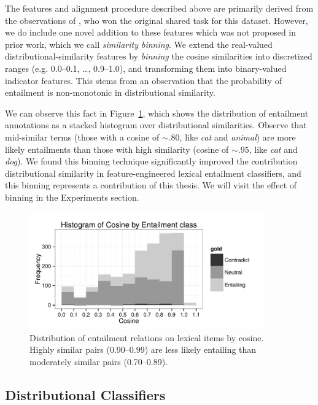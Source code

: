 The features and alignment procedure described above are primarily derived
from the observations of \cite{lai:2014:semeval}, who won the original shared
task for this dataset. However, we do include one novel addition to
these features which was not proposed in prior work, which we call
{\em similarity binning}. We extend the real-valued distributional-similarity
features by {\em binning} the cosine similarities into discretized ranges
(e.g. 0.0--0.1, \ldots, 0.9--1.0), and transforming them into binary-valued
indicator features. This stems from an observation that the probability of
entailment is non-monotonic in distributional similarity.

We can observe this fact in Figure~\ref{fig:valley}, which shows the
distribution of entailment annotations as a stacked histogram over
distributional similarities. Observe that
mid-similar terms (those with a cosine of $\sim.80$, like {\em cat} and {\em
animal}) are more likely entailments than those with high similarity
(cosine of $\sim.95$, like {\em cat} and {\em dog}). We found this binning
technique significantly improved the contribution distributional similarity
in feature-engineered lexical entailment classifiers, and this binning
represents a contribution of this thesis. We will visit the effect of binning
in the Experiments section.

\begin{figure}
  \centering
  \includegraphics[width=0.90\textwidth]{plots/valley.pdf}
  \caption{Distribution of entailment relations on lexical items by cosine.
    Highly similar pairs (0.90--0.99) are less likely entailing than moderately
    similar pairs (0.70--0.89).}
  \label{fig:valley}
\end{figure}

\subsection{Distributional Classifiers}

